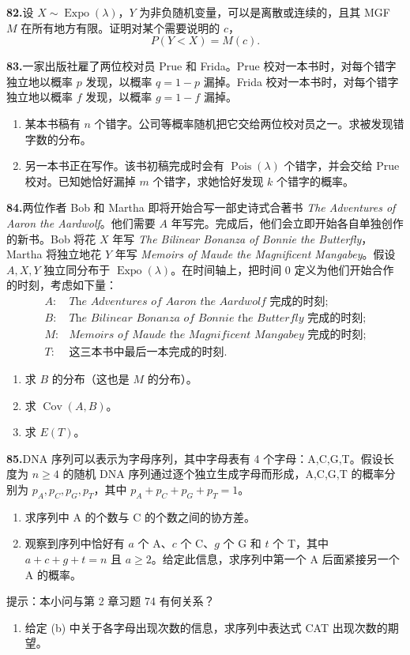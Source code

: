 \documentclass[UTF8, 12pt, fontset=fandol, oneside]{ctexart}
\begin{document}
\noindent\textbf{82.}\quad 设 $X\sim \operatorname{Expo}(\lambda)$，$Y$ 为非负随机变量，可以是离散或连续的，且其 MGF $M$ 在所有地方有限。证明对某个需要说明的 $c$，
\[
  P(Y<X)=M(c).
\]

\noindent\textbf{83.}\quad 一家出版社雇了两位校对员 Prue 和 Frida。Prue 校对一本书时，对每个错字独立地以概率 $p$ 发现，以概率 $q=1-p$ 漏掉。Frida 校对一本书时，对每个错字独立地以概率 $f$ 发现，以概率 $g=1-f$ 漏掉。
\begin{enumerate}
  \item[(a)] 某本书稿有 $n$ 个错字。公司等概率随机把它交给两位校对员之一。求被发现错字数的分布。
  \item[(b)] 另一本书正在写作。该书初稿完成时会有 $\operatorname{Pois}(\lambda)$ 个错字，并会交给 Prue 校对。已知她恰好漏掉 $m$ 个错字，求她恰好发现 $k$ 个错字的概率。
\end{enumerate}

\noindent\textbf{84.}\quad 两位作者 Bob 和 Martha 即将开始合写一部史诗式合著书 \textit{The Adventures of Aaron the Aardwolf}。他们需要 $A$ 年写完。完成后，他们会立即开始各自单独创作的新书。Bob 将花 $X$ 年写 \textit{The Bilinear Bonanza of Bonnie the Butterfly}，Martha 将独立地花 $Y$ 年写 \textit{Memoirs of Maude the Magnificent Mangabey}。假设 $A,X,Y$ 独立同分布于 $\operatorname{Expo}(\lambda)$。在时间轴上，把时间 $0$ 定义为他们开始合作的时刻，考虑如下量：
\[
\begin{array}{ll}
  A: & \textit{The Adventures of Aaron the Aardwolf} \text{ 完成的时刻};\\
  B: & \textit{The Bilinear Bonanza of Bonnie the Butterfly} \text{ 完成的时刻};\\
  M: & \textit{Memoirs of Maude the Magnificent Mangabey} \text{ 完成的时刻};\\
  T: & \text{这三本书中最后一本完成的时刻}.
\end{array}
\]
\begin{enumerate}
  \item[(a)] 求 $B$ 的分布（这也是 $M$ 的分布）。
  \item[(b)] 求 $\operatorname{Cov}(A,B)$。
  \item[(c)] 求 $E(T)$。
\end{enumerate}

\noindent\textbf{85.}\quad DNA 序列可以表示为字母序列，其中字母表有 4 个字母：A,C,G,T。假设长度为 $n\ge 4$ 的随机 DNA 序列通过逐个独立生成字母而形成，A,C,G,T 的概率分别为 $p_A,p_C,p_G,p_T$，其中 $p_A+p_C+p_G+p_T=1$。
\begin{enumerate}
  \item[(a)] 求序列中 A 的个数与 C 的个数之间的协方差。
  \item[(b)] 观察到序列中恰好有 $a$ 个 A、$c$ 个 C、$g$ 个 G 和 $t$ 个 T，其中 $a+c+g+t=n$ 且 $a\ge 2$。给定此信息，求序列中第一个 A 后面紧接另一个 A 的概率。
\end{enumerate}
提示：本小问与第 2 章习题 74 有何关系？
\begin{enumerate}
  \item[(c)] 给定 (b) 中关于各字母出现次数的信息，求序列中表达式 CAT 出现次数的期望。
\end{enumerate}
\end{document}
